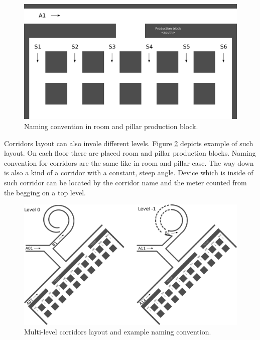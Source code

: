\documentclass[../main.tex]{subfiles}
\begin{document}
\begin{figure}[ht]
\includegraphics[width=\textwidth]{pictures/room_and_pillar_scheme.pdf}
\centering
\caption{Naming convention in room and pillar production block.}
\label{fig:room_and_pillar_scheme}
\end{figure}

Corridors layout can also invole different levels. Figure \ref{fig:mine_with_levels_scheme} depicts example of such layout. On each floor there are placed room and pillar production blocks. Naming convention for corridors are the same like in room and pillar case. The way down is also a kind of a corridor with a constant, steep angle. Device which is inside of such corridor can be located by the corridor name and the meter counted from the begging on a top level.

\begin{figure}[ht]
\includegraphics[width=\textwidth]{pictures/mine_with_levels_scheme.pdf}
\centering
\caption{Multi-level corridors layout and example naming convention.}
\label{fig:mine_with_levels_scheme}
\end{figure}
\end{document}
